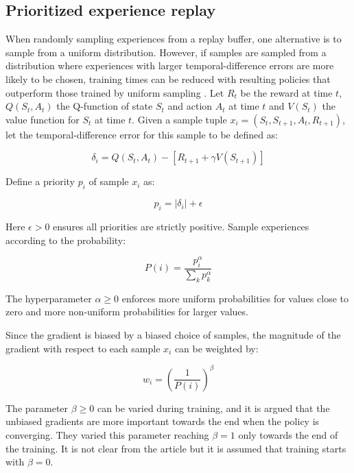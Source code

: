\subsection{Prioritized experience replay}
\label{sec:prio_sampling}

When randomly sampling experiences from a replay buffer, one alternative is to
sample from a uniform distribution. However, if samples are sampled from a
distribution where experiences with larger temporal-difference errors are more
likely to be chosen, training times can be reduced with resulting policies that
outperform those trained by uniform sampling \cite{schaul2015prioritized}. Let
$R_{t}$ be the reward at time $t$, $Q(S_t, A_t)$ the Q-function of state $S_t$
and action $A_t$ at time $t$ and $V(S_t)$ the value function for $S_t$ at time
$t$. Given a sample tuple $x_i = (S_t, S_{t+1}, A_t, R_{t+1})$, let the
temporal-difference error for this sample to be defined as:

\begin{equation}
    \delta_i = Q(S_{t}, A_t) - \left[ R_{t+1} + \gamma V(S_{t+1}) \right]
\end{equation}

Define a priority $p_i$ of sample $x_i$ as:

\begin{equation}
    p_i = |\delta_i| + \epsilon
\end{equation}

Here $\epsilon > 0$ ensures all priorities are strictly positive. Sample experiences
according to the probability:

\begin{equation}
    P(i) = \frac{p_i^\alpha}{\sum_k p_k^\alpha}
\end{equation}

The hyperparameter $\alpha \geq 0$ enforces more uniform probabilities for values close to
zero and more non-uniform probabilities for larger values.

Since the gradient is biased by a biased choice of samples, the magnitude of
the gradient with respect to each sample $x_i$ can be weighted by:

\begin{equation}
    w_i = \left( \frac{1}{P(i)} \right)^\beta
\end{equation}

The parameter $\beta \geq 0$ can be varied during training, and it is argued that
the unbiased gradients are more important towards the end when the policy is
converging. They varied this parameter reaching $\beta = 1$ only towards the
end of the training. It is not clear from the article but it is assumed that
training starts with $\beta = 0$.


